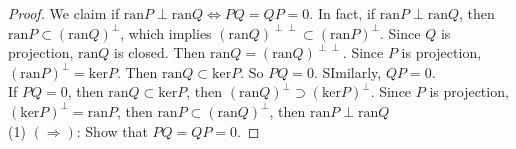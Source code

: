\begin{proof}
    We claim if $\text{ran}P\perp \text{ran}Q\Leftrightarrow PQ=QP=0$.
    In fact, if $\text{ran}P\perp \text{ran}Q$, then $\text{ran}P\subset (\text{ran}Q)^{\perp}$,
    which implies $(\text{ran}Q)^{\perp\perp}\subset (\text{ran}P)^{\perp}$.
    Since $Q$ is projection, $\text{ran}Q$ is closed. Then $\text{ran}Q=(\text{ran}Q)^{\perp\perp}$.
    Since $P$ is projection, $(\text{ran}P)^{\perp}=\text{ker}P$.
    Then $\text{ran}Q\subset \text{ker}P$. So $PQ=0$. SImilarly, $QP=0$.\\
    If $PQ=0$, then $\text{ran}Q\subset \text{ker}P$, then $(\text{ran}Q)^{\perp}\supset (\text{ker}P)^{\perp}$.
    Since $P$ is projection, $(\text{ker}P)^{\perp}=\text{ran}P$, then $\text{ran}P\subset (\text{ran}Q)^{\perp}$,
    then $\text{ran}P\perp \text{ran}Q$\\
    (1)
    $(\Rightarrow)$: Show that $PQ=QP=0$. 
   

\end{proof}
